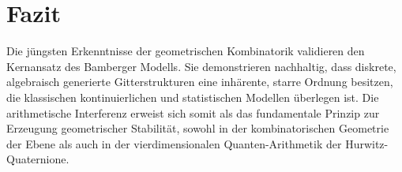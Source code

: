 \documentclass[11pt,a4paper]{article}
\begin{document}
\section{Fazit}
Die jüngsten Erkenntnisse der geometrischen Kombinatorik validieren den Kernansatz des Bamberger Modells. Sie demonstrieren nachhaltig, dass diskrete, algebraisch generierte Gitterstrukturen eine inhärente, starre Ordnung besitzen, die klassischen kontinuierlichen und statistischen Modellen überlegen ist. Die arithmetische Interferenz erweist sich somit als das fundamentale Prinzip zur Erzeugung geometrischer Stabilität, sowohl in der kombinatorischen Geometrie der Ebene als auch in der vierdimensionalen Quanten-Arithmetik der Hurwitz-Quaternione.
\end{document}
